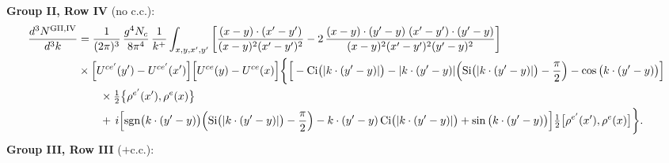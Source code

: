 \documentclass[9pt]{article}
\numberwithin{equation}{section}
\begin{document}
\textbf{Group II, Row IV} (no c.c.):
\begin{align}
\frac{d^{3}N^{\rm GII,IV}}{d^{3}k}&=\frac{1}{(2\pi)^{3}}\,\frac{g^{4}N_{c}}{8\pi^{4}}\,\frac{1}{k^{+}}\int_{x,y,x',y'}\bigg[\frac{(x-y)\cdot(x'-y')}{(x-y)^{2}(x'-y')^{2}}-2\,\frac{(x-y)\cdot(y'-y)\;(x'-y')\cdot(y'-y)}{(x-y)^{2}(x'-y')^{2}(y'-y)^{2}}\bigg]\notag\\
&\times\Big[U^{ce'}(y')-U^{ce'}(x')\Big]\Big[U^{ce}(y)-U^{ce}(x)\Big]\bigg\{\Big[-\mathrm{Ci}\big(|k\cdot(y'-y)|\big)-|k\cdot(y'-y)|\Big(\mathrm{Si}\big(|k\cdot(y'-y)|\big)-\frac{\pi}{2}\Big)-\cos\big(k\cdot(y'-y)\big)\Big]\notag\\
&\qquad\times\tfrac12\big\{\rho^{e'}(x'),\rho^{e}(x)\big\}\notag\\
&\qquad+\,i\Big[\mathrm{sgn}\big(k\cdot(y'-y)\big)\Big(\mathrm{Si}\big(|k\cdot(y'-y)|\big)-\frac{\pi}{2}\Big)-k\cdot(y'-y)\,\mathrm{Ci}\big(|k\cdot(y'-y)|\big)+\sin\big(k\cdot(y'-y)\big)\Big]\tfrac12\big[\rho^{e'}(x'),\rho^{e}(x)\big]\bigg\}.
\end{align}
\textbf{Group III, Row III} ($+$c.c.):
\end{document}
